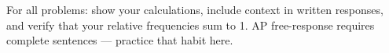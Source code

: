\documentclass[10pt]{article}
\begin{document}
\namedateperiod

\vspace{0.1in}

\begin{tcolorbox}[colback=sky, colframe=navy, boxrule=0.8pt, arc=2mm,
    left=3mm, right=3mm, top=1.5mm, bottom=1.5mm]
\small For all problems: show your calculations, include context in written responses,
and verify that your relative frequencies sum to 1. AP free-response requires complete
sentences --- practice that habit here.
\end{tcolorbox}

\vspace{0.14in}

\end{document}
